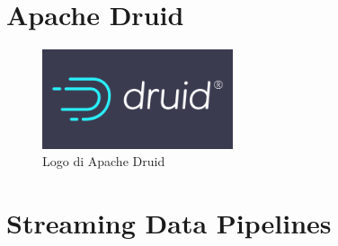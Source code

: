 \pagebreak
\section{Apache Druid}

\begin{figure}[h]
    \centering
    \includegraphics[width=0.5\textwidth]{images/componenti/logo_druid.png}
    \caption{Logo di Apache Druid}
    \label{fig:logo_druid}
\end{figure}
\section{Streaming Data Pipelines}
\newpage
\pagestyle{empty}
\null %
\newpage